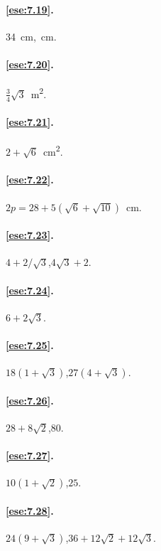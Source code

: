 \paragraph{\ref{ese:7.19}.}
34~cm,~cm.

\paragraph{\ref{ese:7.20}.}
$\frac{3}{4}\sqrt{3}$~m\textsuperscript{2}.

\paragraph{\ref{ese:7.21}.}
$2+\sqrt{6}$~cm\textsuperscript{2}.

\paragraph{\ref{ese:7.22}.}
$2p=28+5(\sqrt{6}+\sqrt{10})$~cm.

\paragraph{\ref{ese:7.23}.}
$4+2/\sqrt{3}$,\quad $4\sqrt{3}+2$.

\paragraph{\ref{ese:7.24}.}
$6+2\sqrt{3}$.

\paragraph{\ref{ese:7.25}.}
$18(1+\sqrt{3})$,\quad $27(4+\sqrt{3})$.

\paragraph{\ref{ese:7.26}.}
$28+8\sqrt{2}$,\quad $80$.

\paragraph{\ref{ese:7.27}.}
$10(1+\sqrt{2})$,\quad $25$.

\paragraph{\ref{ese:7.28}.}
$24(9+\sqrt{3})$,\quad $36+12\sqrt{2}+12\sqrt{3}$.

